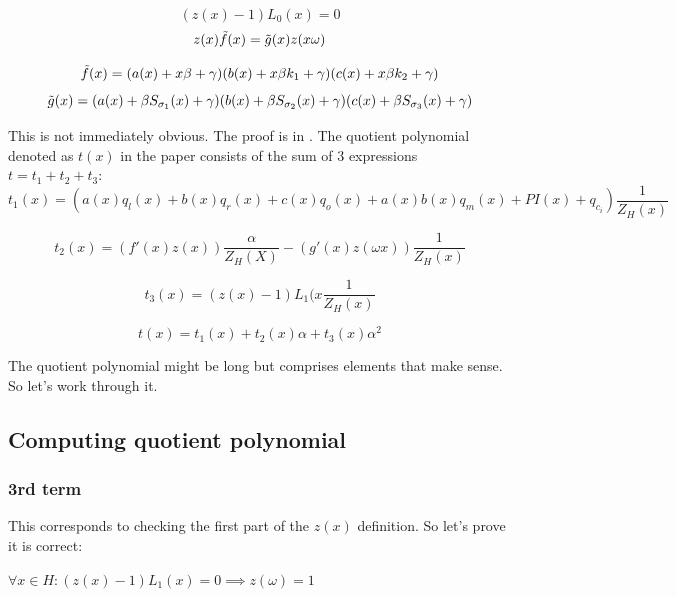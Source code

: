\begin{equation}
\label{eq:1-prem-check}
    (z(x)-1)L_0(x) = 0
\end{equation}
\begin{equation}
\label{eq:2-prem-check}
    z(x)\Tilde{f}(x) = \Tilde{g}(x)z(x\omega)
\end{equation}

$$\Tilde{f}(x) = (a(x) + x \beta + \gamma)(b(x) + x \beta k_1+ \gamma)(c(x) + x \beta k_2+ \gamma)$$
$$\Tilde{g}(x) = (a(x) + \beta S_{\sigma_1}(x) + \gamma)(b(x) + \beta S_{\sigma_2}(x)+ \gamma)(c(x) + \beta S_{\sigma_3}(x) + \gamma)$$

This is not immediately obvious. The proof is in . The quotient polynomial denoted as $t(x)$ in the paper consists of the sum of 3 expressions 
$t = t_1 + t_2 + t_3$:
\begin{equation}\label{quotient1}
    t_1(x) = (a(x)q_{l}(x) + b(x)q_{r}(x) + c(x)q_{o}(x) + a(x)b(x)q_{m}(x) + PI(x) + q_{c_i})\frac{1}{Z_H(x)}
\end{equation}

\begin{equation}\label{quotient2}
    t_2(x) = (f'(x)z(x))\frac{\alpha}{Z_H(X)} - (g'(x)z(\omega x))\frac{1}{Z_H(x)}
\end{equation}

\begin{equation}\label{quotient3}
    t_3(x) = (z(x)-1)L_1(x\frac{1}{Z_H(x)}
\end{equation}

$$t(x) = t_1(x) + t_2(x) \alpha + t_3(x) \alpha^2$$

The quotient polynomial might be long but comprises elements that make sense. So let's work through it.

\subsection{Computing quotient polynomial}
\label{sec:computing-quotient-polynomial}

\subsubsection{3rd term}
This corresponds to checking the first part of the $z(x)$ definition. So let's prove it is correct: 
\begin{lemma}
    $\forall x \in H: (z(x)-1)L_1(x) = 0 \implies z(\omega) = 1$
\end{lemma}

